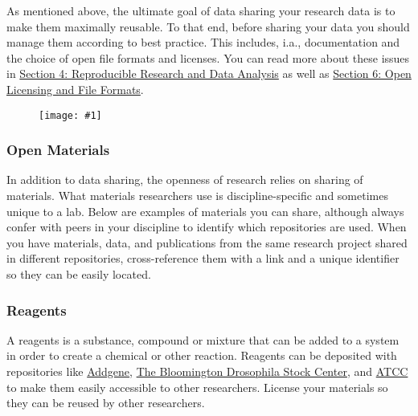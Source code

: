 \documentclass{article}
\newlength{\imgwidth}
\newcommand\scaledgraphics[2]{%
                
\settowidth{\imgwidth}{\texttt{[image: \#1]}}%
                
\setlength{\imgwidth}{\minof{\imgwidth}{#2\textwidth}}%
                
\texttt{[image: \#1]}%
                
}
\begin{document}
As mentioned above, the ultimate goal of data sharing your research data is to make them maximally reusable. To that end, before sharing your data you should manage them according to best practice. This includes, i.a., documentation and the choice of open file formats and licenses. You can read more about these issues in \href{https://github.com/Open-Science-Training-Handbook/Open-Science-Training-Handbook_EN/blob/master/02OpenScienceBasics/04ReproducibleResearchAndDataAnalysis.md}{Section 4: Reproducible Research and Data Analysis} as well as \href{https://github.com/Open-Science-Training-Handbook/Open-Science-Training-Handbook_EN/blob/master/02OpenScienceBasics/06OpenLicensingAndFileFormats.md}{Section 6: Open Licensing and File Formats}.

\begin{figure}
\scaledgraphics{633eb0bd-b4b7-4e0f-b4b8-c6e57113aeb1.png}{1}
\label{F3377441}
\end{figure}


\subsubsection{\textbf{Open Materials}}\label{open-materials}



In addition to data sharing, the openness of research relies on sharing of materials. What materials researchers use is discipline-specific and sometimes unique to a lab. Below are examples of materials you can share, although always confer with peers in your discipline to identify which repositories are used. When you have materials, data, and publications from the same research project shared in different repositories, cross-reference them with a link and a unique identifier so they can be easily located.


\subsubsection{\textbf{Reagents}}\label{reagents}



A reagents is a substance, compound or mixture that can be added to a system in order to create a chemical or other reaction. Reagents can be deposited with repositories like \href{https://www.addgene.org/}{Addgene}, \href{https://bdsc.indiana.edu/}{The Bloomington Drosophila Stock Center}, and \href{https://www.atcc.org/}{ATCC} to make them easily accessible to other researchers. License your materials so they can be reused by other researchers.
\end{document}
